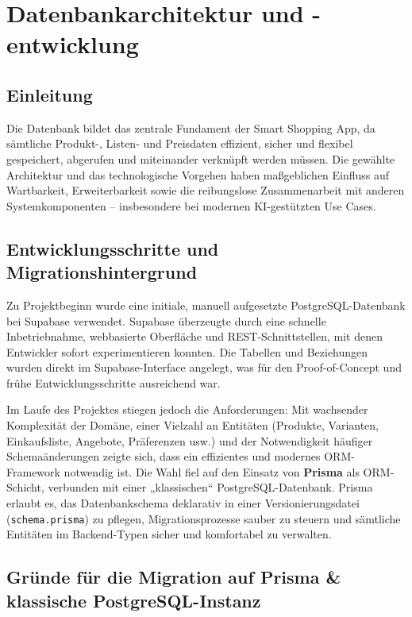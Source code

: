 \chapter{Datenbankarchitektur und -entwicklung}
\renewcommand{\authorinitials}{MK}

\section{Einleitung}

Die Datenbank bildet das zentrale Fundament der Smart Shopping App, da sämtliche Produkt-, Listen- und Preisdaten effizient, sicher und flexibel gespeichert, abgerufen und miteinander verknüpft werden müssen. Die gewählte Architektur und das technologische Vorgehen haben maßgeblichen Einfluss auf Wartbarkeit, Erweiterbarkeit sowie die reibungslose Zusammenarbeit mit anderen Systemkomponenten – insbesondere bei modernen KI-gestützten Use Cases.

\section{Entwicklungsschritte und Migrationshintergrund}

Zu Projektbeginn wurde eine initiale, manuell aufgesetzte PostgreSQL-Datenbank bei Supabase verwendet. Supabase überzeugte durch eine schnelle Inbetriebnahme, webbasierte Oberfläche und REST-Schnittstellen, mit denen Entwickler sofort experimentieren konnten. Die Tabellen und Beziehungen wurden direkt im Supabase-Interface angelegt, was für den Proof-of-Concept und frühe Entwicklungsschritte ausreichend war.

Im Laufe des Projektes stiegen jedoch die Anforderungen: Mit wachsender Komplexität der Domäne, einer Vielzahl an Entitäten (Produkte, Varianten, Einkaufsliste, Angebote, Präferenzen usw.) und der Notwendigkeit häufiger Schemaänderungen zeigte sich, dass ein effizientes und modernes ORM-Framework notwendig ist. Die Wahl fiel auf den Einsatz von \textbf{Prisma} als ORM-Schicht, verbunden mit einer „klassischen“ PostgreSQL-Datenbank. Prisma erlaubt es, das Datenbankschema deklarativ in einer Versionierungsdatei (\texttt{schema.prisma}) zu pflegen, Migrationsprozesse sauber zu steuern und sämtliche Entitäten im Backend-Typen sicher und komfortabel zu verwalten.

\section{Gründe für die Migration auf Prisma \& klassische PostgreSQL-Instanz}

